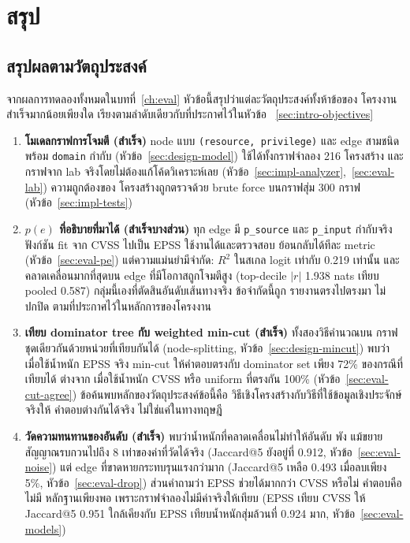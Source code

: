 \chapter{สรุป}\label{ch:concl}

\section{สรุปผลตามวัตถุประสงค์}\label{sec:concl-objectives}

จากผลการทดลองทั้งหมดในบทที่~\ref{ch:eval} หัวข้อนี้สรุปว่าแต่ละวัตถุประสงค์ทั้งห้าข้อของ
โครงงานสำเร็จมากน้อยเพียงใด เรียงตามลำดับเดียวกับที่ประกาศไว้ในหัวข้อ~
\ref{sec:intro-objectives}

\begin{enumerate}[leftmargin=1.6em]

\item \textbf{โมเดลกราฟการโจมตี (สำเร็จ)} node แบบ \texttt{(resource, privilege)} และ
edge สามชนิดพร้อม \texttt{domain} กำกับ (หัวข้อ~\ref{sec:design-model}) ใช้ได้ทั้งกราฟจำลอง 216 โครงสร้าง
และกราฟจาก lab จริงโดยไม่ต้องแก้โค้ดวิเคราะห์เลย (หัวข้อ~\ref{sec:impl-analyzer},~\ref{sec:eval-lab}) ความถูกต้องของ
โครงสร้างถูกตรวจด้วย brute force บนกราฟสุ่ม 300 กราฟ (หัวข้อ~\ref{sec:impl-tests})

\item \textbf{$p(e)$ ที่อธิบายที่มาได้ (สำเร็จบางส่วน)} ทุก edge มี \texttt{p\_source} และ
\texttt{p\_input} กำกับจริง ฟังก์ชัน fit จาก CVSS ไปเป็น EPSS ใช้งานได้และตรวจสอบ
ย้อนกลับได้ทีละ metric (หัวข้อ~\ref{sec:eval-pe}) แต่ความแม่นยำมีจำกัด: $R^2$ ในสเกล logit เท่ากับ
0.219 เท่านั้น และคลาดเคลื่อนมากที่สุดบน edge ที่มีโอกาสถูกโจมตีสูง (top-decile $|r|$
1.938 nats เทียบ pooled 0.587) กลุ่มนี้เองที่ตัดสินอันดับเส้นทางจริง ข้อจำกัดนี้ถูก
รายงานตรงไปตรงมา ไม่ปกปิด ตามที่ประกาศไว้ในหลักการของโครงงาน

\item \textbf{เทียบ dominator tree กับ weighted min-cut (สำเร็จ)} ทั้งสองวิธีคำนวณบน
กราฟชุดเดียวกันด้วยหน่วยที่เทียบกันได้ (node-splitting, หัวข้อ~\ref{sec:design-mincut}) พบว่าเมื่อใช้น้ำหนัก
EPSS จริง min-cut ให้คำตอบตรงกับ dominator set เพียง 72\% ของกรณีที่เทียบได้ ต่างจาก
เมื่อใช้น้ำหนัก CVSS หรือ uniform ที่ตรงกัน 100\% (หัวข้อ~\ref{sec:eval-cut-agree})
ข้อค้นพบหลักของวัตถุประสงค์ข้อนี้คือ วิธีเชิงโครงสร้างกับวิธีที่ใช้ข้อมูลเชิงประจักษ์จริงให้
คำตอบต่างกันได้จริง ไม่ใช่แค่ในทางทฤษฎี

\item \textbf{วัดความทนทานของอันดับ (สำเร็จ)} พบว่าน้ำหนักที่คลาดเคลื่อนไม่ทำให้อันดับ
พัง แม้ขยายสัญญาณรบกวนไปถึง 8 เท่าของค่าที่วัดได้จริง (Jaccard@5 ยังอยู่ที่ 0.912,
หัวข้อ~\ref{sec:eval-noise}) แต่ edge ที่ขาดหายกระทบรุนแรงกว่ามาก (Jaccard@5 เหลือ 0.493 เมื่อลบเพียง
5\%, หัวข้อ~\ref{sec:eval-drop}) ส่วนคำถามว่า EPSS ช่วยได้มากกว่า CVSS หรือไม่ คำตอบคือไม่มี
หลักฐานเพียงพอ เพราะกราฟจำลองไม่มีค่าจริงให้เทียบ (EPSS เทียบ CVSS ให้ Jaccard@5
0.951 ใกล้เคียงกับ EPSS เทียบน้ำหนักสุ่มล้วนที่ 0.924 มาก, หัวข้อ~\ref{sec:eval-models})


\end{enumerate}

